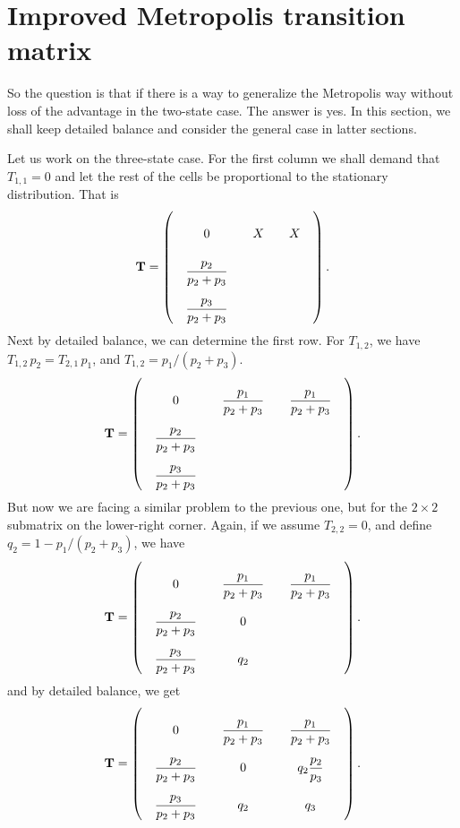 \documentclass[12pt]{article}
\begin{document}
\section{Improved Metropolis transition matrix}



So the question is that if there is a way to generalize
the Metropolis way without loss of the advantage in the two-state case.
%
The answer is yes.
%
In this section, we shall keep detailed balance
and consider the general case in latter sections.


Let us work on the three-state case.
%
For the first column we shall demand that $T_{1,1} = 0$
and let the rest of the cells be proportional to
the stationary distribution. That is
$$
\mathbf T =
\left(
  \arraycolsep=10.0pt\def\arraystretch{2.5}
  \begin{array}{cccccc}
    0   &  X & X \\
    \dfrac{p_2}{p_2+p_3} &  & \\
    \dfrac{p_3}{p_2+p_3} &  &
  \end{array}
\right).
$$
Next by detailed balance, we can determine the first row.
For $T_{1,2}$,
we have $T_{1,2} \, p_2 = T_{2,1} \, p_1$,
and $T_{1,2} = p_1/(p_2 + p_3)$.
$$
\mathbf T =
\left(
  \arraycolsep=10.0pt\def\arraystretch{2.5}
  \begin{array}{cccccc}
    0   &  \dfrac{p_1}{p_2+p_3} & \dfrac{p_1}{p_2+p_3} \\
    \dfrac{p_2}{p_2+p_3} &  & \\
    \dfrac{p_3}{p_2+p_3} &  &
  \end{array}
\right).
$$
But now we are facing a similar problem to the previous one,
but for the $2\times 2$ submatrix on the lower-right corner.
Again, if we assume $T_{2,2} = 0$, and define $q_2 = 1- p_1/(p_2 + p_3)$,
we have
$$
\mathbf T =
\left(
  \arraycolsep=10.0pt\def\arraystretch{2.5}
  \begin{array}{cccccc}
    0   &  \dfrac{p_1}{p_2+p_3} & \dfrac{p_1}{p_2+p_3} \\
    \dfrac{p_2}{p_2+p_3} &  0 & \\
    \dfrac{p_3}{p_2+p_3} &  q_2 &
  \end{array}
\right).
$$
and by detailed balance, we get
$$
\mathbf T =
\left(
  \arraycolsep=10.0pt\def\arraystretch{2.5}
  \begin{array}{cccccc}
    0   &  \dfrac{p_1}{p_2+p_3} & \dfrac{p_1}{p_2+p_3} \\
    \dfrac{p_2}{p_2+p_3} &  0 & q_2 \dfrac{p_2}{p_3} \\
    \dfrac{p_3}{p_2+p_3} &  q_2 & q_3
  \end{array}
\right).
$$
\end{document}

